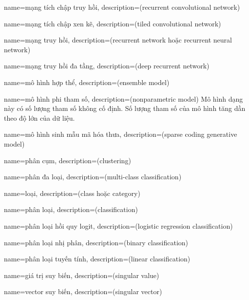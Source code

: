{
    name={mạng tích chập truy hồi},
    description={(recurrent convolutional network)}
}

{
    name={mạng tích chập xen kẽ},
    description={(tiled convolutional network)}
}

{
    name={mạng truy hồi},
    description={(recurrent network hoặc recurrent neural network)}
}

{
    name={mạng truy hồi đa tầng},
    description={(deep recurrent network)}
}

{
    name={mô hình hợp thể},
    description={(ensemble model)}
}

{
    name={mô hình phi tham số},
    description={(nonparametric model) Mô hình dạng này có số lượng
    tham số không cố định. Số lượng tham số của mô hình tăng dần
    theo độ lớn của dữ liệu.}
}

{
    name={mô hình sinh mẫu mã hóa thưa},
    description={(sparse coding generative model)}
}

{
    name={phân cụm},
    description={(clustering)}
}

{
    name={phân đa loại},
    description={(multi-class classification)}
}

{
    name={loại},
    description={(class hoặc category)}
}

{
    name={phân loại},
    description={(classification)}
}

{
    name={phân loại hồi quy logit},
    description={(logistic regression classification)}
}

{
    name={phân loại nhị phân},
    description={(binary classification)}
}

{
    name={phân loại tuyến tính},
    description={(linear classification)}
}

{
    name={giá trị suy biến},
    description={(singular value)}
}

{
    name={vector suy biến},
    description={(singular vector)}
}

